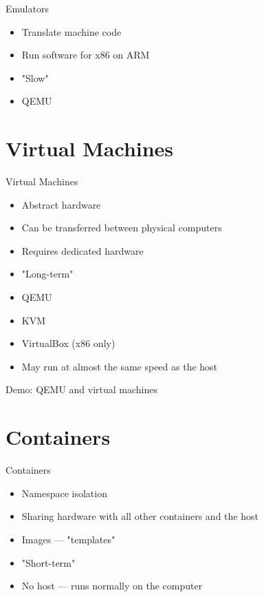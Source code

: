 \documentclass{dcpresentation}
\begin{document}
 \begin{frame}{Emulators}
  \begin{itemize}
   \item Translate machine code
   \item Run software for x86 on ARM
   \item "Slow"
   \item QEMU
  \end{itemize}
 \end{frame}
 
  \section{Virtual Machines} 
 
 \begin{frame}{Virtual Machines}
  \begin{itemize}
   \item Abstract hardware
   \item Can be transferred between physical computers
   \item Requires dedicated hardware
   \item "Long-term"
   \item QEMU
   \item KVM
   \item VirtualBox (x86 only)
   \item May run at almost the same speed as the host
  \end{itemize}
 \end{frame}
  
 \begin{frame}
  \centering \alert{Demo: QEMU and virtual machines} 
 \end{frame}   
 
 \section{Containers} 
  
 \begin{frame}{Containers}
  \begin{itemize}
   \item Namespace isolation
   \item Sharing hardware with all other containers and the host
   \item Images --- "templates"
   \item "Short-term"
   \item No host --- runs normally on the computer
  \end{itemize}
 \end{frame}
 
\end{document}
